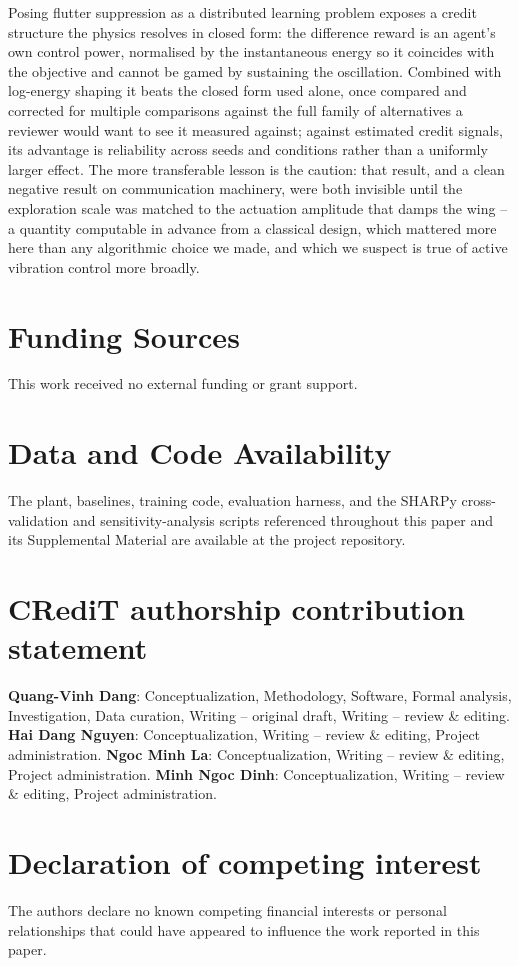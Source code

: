 \documentclass[preprint,11pt]{elsarticle}
\begin{document}
Posing flutter suppression as a distributed learning problem exposes a
credit structure the physics resolves in closed form: the difference
reward is an agent's own control power, normalised by the instantaneous
energy so it coincides with the objective and cannot be gamed by
sustaining the oscillation. Combined with log-energy shaping it beats the
closed form used alone, once compared and corrected for multiple
comparisons against the full family of alternatives a reviewer would want
to see it measured against; against estimated credit signals, its
advantage is reliability across seeds and conditions rather than a
uniformly larger effect. The more transferable lesson is the caution: that
result, and a clean negative result on communication machinery, were both
invisible until the exploration scale was matched to the actuation
amplitude that damps the wing -- a quantity computable in advance from a
classical design, which mattered more here than any algorithmic choice we
made, and which we suspect is true of active vibration control more
broadly.

\section*{Funding Sources}
This work received no external funding or grant support.

\section*{Data and Code Availability}
The plant, baselines, training code, evaluation harness, and the SHARPy
cross-validation and sensitivity-analysis scripts referenced throughout
this paper and its Supplemental Material are available at the project
repository.

\section*{CRediT authorship contribution statement}
\textbf{Quang-Vinh Dang}: Conceptualization, Methodology, Software, Formal
analysis, Investigation, Data curation, Writing -- original draft, Writing
-- review \& editing. \textbf{Hai Dang Nguyen}: Conceptualization, Writing
-- review \& editing, Project administration. \textbf{Ngoc Minh La}:
Conceptualization, Writing -- review \& editing, Project administration.
\textbf{Minh Ngoc Dinh}: Conceptualization, Writing -- review \& editing,
Project administration.

\section*{Declaration of competing interest}
The authors declare no known competing financial interests or personal
relationships that could have appeared to influence the work reported in
this paper.
\end{document}
